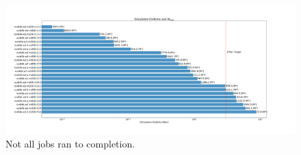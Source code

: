 \documentclass[preprint1]{aastex}
\numberwithin{equation}{section}
\begin{document}
\begin{figure}
    \centering
    \includegraphics{JobProgress}
    \caption{Not all jobs ran to completion.}
    \label{fig:JobProgress}
\end{figure}
\end{document}
